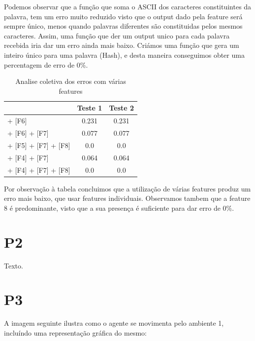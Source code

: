 \documentclass[11pt,twocolumn]{article}
\begin{document}
    Podemos observar que a função que soma o ASCII dos caracteres
    constituintes da palavra, tem um erro muito reduzido visto que o output dado pela feature será sempre único, menos quando palavras diferentes são constituidas pelos mesmos caracteres. 
    Assim, uma função que der um output unico para cada palavra recebida iria dar um erro ainda mais baixo. Criámos uma função que gera um inteiro único para uma palavra (Hash), e desta maneira conseguimos obter uma percentagem de erro de 0\%.
    
    \begin{table}[htbp]
        \centering
        \caption{Analise coletiva dos erros com várias features}
        \label{my-label}
        \begin{tabular}{|l|c|c|}
        \hline
        \multicolumn{1}{|r|}{}                                      & \textbf{Teste 1} & \textbf{Teste 2}                    \\ \hline
        [F5] + [F6] & 0.231 & 0.231 \\ \hline
        [F5] + [F6] + [F7]     & 0.077  & 0.077                   \\ \hline
        [F4] + [F5] + [F7] + [F8]   & 0.0              & 0.0                                 \\ \hline
        [F3] + [F4] + [F7]   & 0.064             & 0.064                                 \\ \hline
        [F3] + [F4] + [F7] + [F8]   & 0.0          & 0.0                                 \\ \hline
        \end{tabular}
        \end{table}
    \par  
    Por observação à tabela concluimos que a utilização de várias features produz um erro mais baixo, que usar features individuais. 
    Observamos tambem que a feature 8 é predominante, visto que a sua presença é suficiente para dar erro de 0\%.

\section*{P2}

Texto.

\section*{P3}

A imagem seguinte ilustra como o agente se movimenta pelo ambiente 1, incluíndo uma representação gráfica do mesmo:
\end{document}
